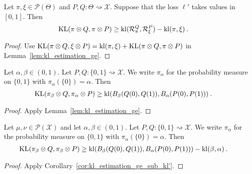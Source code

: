 \begin{corollary}
  \label{cor:kl_estimation_ge_sub_kl'}
  Let $\pi, \xi \in \mathcal P(\Theta)$ and $P, Q : \Theta \rightsquigarrow \mathcal X$. Suppose that the loss $\ell'$ takes values in $[0,1]$. Then
  \begin{align*}
  \operatorname{KL}(\pi \otimes Q, \pi \otimes P)
  &\ge \operatorname{kl}(\mathcal R_\pi^Q, \mathcal R_\xi^P) - \operatorname{kl}(\pi, \xi)
  \: .
  \end{align*}
\end{corollary}

\begin{proof}%
{}
Use $\operatorname{KL}(\pi \otimes Q, \xi \otimes P) = \operatorname{kl}(\pi, \xi) + \operatorname{KL}(\pi \otimes Q, \pi \otimes P)$ in Lemma~\ref{lem:kl_estimation_ge}.
\end{proof}


\begin{corollary}
  \label{cor:kl_estimation_ge_binary}
  Let $\alpha, \beta \in (0, 1)$. Let $P, Q : \{0,1\} \rightsquigarrow \mathcal X$. We write $\pi_\alpha$ for the probability measure on $\{0,1\}$ with $\pi_\alpha(\{0\}) = \alpha$. Then
  \begin{align*}
  \operatorname{KL}(\pi_\beta \otimes Q, \pi_\alpha \otimes P)
  &\ge \operatorname{kl}(B_\beta(Q(0), Q(1)), B_\alpha(P(0), P(1)))
  \: .
  \end{align*}
\end{corollary}

\begin{proof}%
{}
Apply Lemma~\ref{lem:kl_estimation_ge}.
\end{proof}


\begin{corollary}
  \label{cor:kl_estimation_ge_sub_kl}
  Let $\mu, \nu \in \mathcal P(\mathcal X)$ and let $\alpha, \beta \in (0, 1)$. Let $P, Q : \{0,1\} \rightsquigarrow \mathcal X$. We write $\pi_\alpha$ for the probability measure on $\{0,1\}$ with $\pi_\alpha(\{0\}) = \alpha$. Then
  \begin{align*}
  \operatorname{KL}(\pi_\beta \otimes Q, \pi_\beta \otimes P)
  &\ge \operatorname{kl}(B_\beta(Q(0), Q(1)), B_\alpha(P(0), P(1))) - \operatorname{kl}(\beta, \alpha)
  \: .
  \end{align*}
\end{corollary}

\begin{proof}%
Apply Corollary~\ref{cor:kl_estimation_ge_sub_kl'}.
\end{proof}


